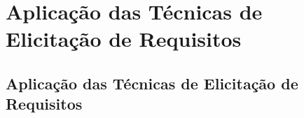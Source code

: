 \part{Aplicação das Técnicas de Elicitação de Requisitos}
\chapter[Aplicação das Técnicas de Elicitação de Requisitos]{Aplicação das Técnicas de Elicitação de Requisitos} \label{sec:tec}